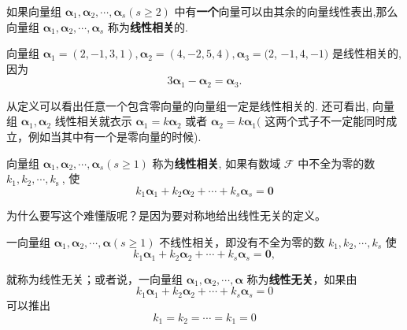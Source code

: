 \begin{definition}[向量组的线性相关]
如果向量组 $\boldsymbol{\alpha}_1, \boldsymbol{\alpha}_2, \cdots, \boldsymbol{\alpha}_s(s \geqslant 2)$ 中有\textbf{一个}向量可以由其余的向量线性表出,那么向量组 $\boldsymbol{\alpha}_1, \boldsymbol{\alpha}_2, \cdots, \boldsymbol{\alpha}_s$ 称为\textcolor{third}{\bf 线性相关}的.
\end{definition}

\begin{exercise}
向量组 $\boldsymbol{\alpha}_1=(2,-1,3,1), \boldsymbol{\alpha}_2=(4,-2,5,4), \boldsymbol{\alpha}_3=(2$, $-1,4,-1)$ 是线性相关的, 因为
$$
3 \boldsymbol{\alpha}_1-\boldsymbol{\alpha}_2=\boldsymbol{\alpha}_3 .
$$
\end{exercise}

从定义可以看出任意一个包含零向量的向量组一定是线性相关的. 还可看出, 向量组 $\boldsymbol{\alpha}_1, \boldsymbol{\alpha}_2$ 线性相关就衣示 $\boldsymbol{\alpha}_1=k \boldsymbol{\alpha}_2$ 或者 $\boldsymbol{\alpha}_2=k \boldsymbol{\alpha}_1($ 这两个式子不一定能同时成立，例如当其中有一个是零向量的时候).

\begin{definition}[线性相关难懂版]
    向量组 $\boldsymbol{\alpha}_1, \boldsymbol{\alpha}_2, \cdots, \boldsymbol{\alpha}_s(s \geqslant 1)$ 称为\textcolor{third}{\bf 线性相关}, 如果有数域 $\mathcal{F}$ 中不全为零的数 $k_1, k_2, \cdots, k_{\text {s }}$, 使
$$
k_1 \boldsymbol{\alpha}_1+k_2 \boldsymbol{\alpha}_2+\cdots+k_s \boldsymbol{\alpha}_s=\mathbf{0}
$$
\end{definition}

为什么要写这个难懂版呢？是因为要对称地给出线性无关的定义。

\begin{definition}[向量组线性无关]
    一向量组 $\boldsymbol{\alpha}_1, \boldsymbol{\alpha}_2, \cdots, \boldsymbol{\alpha}(s \geqslant 1)$ 不线性相关，即没有不全为零的数 $k_1, k_2, \cdots, k_s$ 使
$$
k_1 \boldsymbol{\alpha}_1+k_2 \boldsymbol{\alpha}_2+\cdots+k_s \boldsymbol{\alpha}_s=\mathbf{0},
$$

就称为线性无关；或者说，一向量组 $\boldsymbol{\alpha}_1, \boldsymbol{\alpha}_2, \cdots, \boldsymbol{\alpha}$ 称为\textcolor{third}{\bf 线性无关}，如果由
$$
k_1 \boldsymbol{\alpha}_1+k_2 \boldsymbol{\alpha}_2+\cdots+k_s \boldsymbol{\alpha}_s=0
$$
可以推出
$$
k_1=k_2=\cdots=k_1=0
$$
\end{definition}


